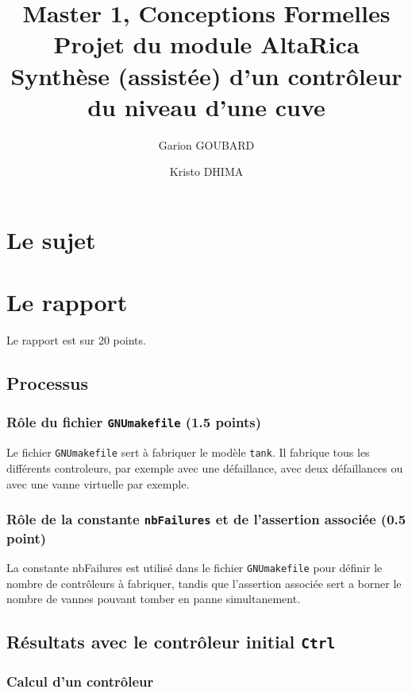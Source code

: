 \documentclass[a4paper]{book}
\newcommand{\altarica}{{\sc AltaRica}}
\begin{document}
\title{Master 1, Conceptions Formelles\\
Projet du module \altarica\\
Synthèse (assistée) d'un contrôleur du niveau d'une cuve}

\date{}

\author{Garion GOUBARD \and Kristo DHIMA}

\maketitle

\chapter{Le sujet}


\chapter{Le rapport}
Le rapport est sur 20 points.

\section{Processus}
\subsection{Rôle du fichier {\tt GNUmakefile} (1.5 points)}
Le fichier {\tt GNUmakefile} sert à fabriquer le modèle {\tt tank}. Il fabrique tous les
différents controleurs, par exemple avec une défaillance, avec deux défaillances ou avec
une vanne virtuelle par exemple.

\subsection{Rôle de la constante {\tt nbFailures} et de l'assertion associée (0.5 point)}
La constante nbFailures est utilisé dans le fichier {\tt GNUmakefile} pour définir le
nombre de contrôleurs à fabriquer, tandis que l'assertion associée sert a borner le nombre
de vannes pouvant tomber en panne simultanement.

\section{Résultats avec le contrôleur initial {\tt Ctrl}}
\subsection{Calcul d'un contrôleur}
\end{document}

